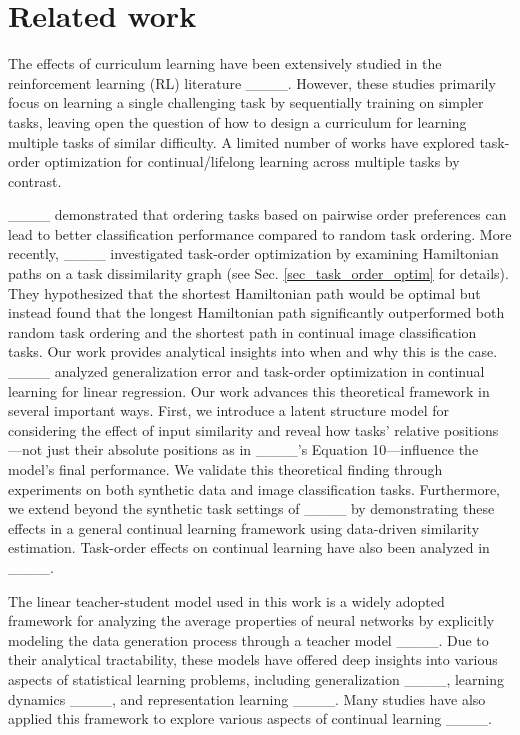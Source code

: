 \section{Related work}
The effects of curriculum learning have been extensively studied in the reinforcement learning (RL) literature ____. However, these studies primarily focus on learning a single challenging task by sequentially training on simpler tasks, leaving open the question of how to design a curriculum for learning multiple tasks of similar difficulty. A limited number of works have explored task-order optimization for continual/lifelong learning across multiple tasks by contrast.

____ demonstrated that ordering tasks based on pairwise order preferences can lead to better classification performance compared to random task ordering. More recently, ____ investigated task-order optimization by examining Hamiltonian paths on a task dissimilarity graph (see Sec. \ref{sec_task_order_optim} for details). They hypothesized that the shortest Hamiltonian path would be optimal but instead found that the longest Hamiltonian path significantly outperformed both random task ordering and the shortest path in continual image classification tasks. Our work provides analytical insights into when and why this is the case.
____ analyzed generalization error and task-order optimization in continual learning for linear regression. Our work advances this theoretical framework in several important ways. First, we introduce a latent structure model for considering the effect of input similarity and reveal how tasks' relative positions—not just their absolute positions as in ____'s Equation 10—influence the model's final performance. We validate this theoretical finding through experiments on both synthetic data and image classification tasks. Furthermore, we extend beyond the synthetic task settings of ____ by demonstrating these effects in a general continual learning framework using data-driven similarity estimation.
Task-order effects on continual learning have also been analyzed in ____.


The linear teacher-student model used in this work is a widely adopted framework for analyzing the average properties of neural networks by explicitly modeling the data generation process through a teacher model ____. Due to their analytical tractability, these models have offered deep insights into various aspects of statistical learning problems, including generalization ____, learning dynamics ____, and representation learning ____. Many studies have also applied this framework to explore various aspects of continual learning ____.

